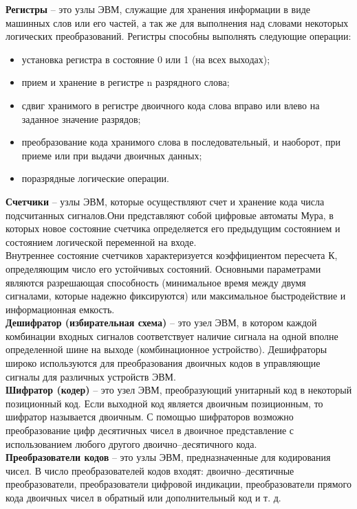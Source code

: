 \textbf{Регистры} -- это узлы ЭВМ, служащие для хранения информации в виде машинных слов или его частей, а так же для выполнения над словами некоторых логических преобразований.
Регистры способны выполнять следующие операции:
\begin{itemize}
  \item установка регистра в состояние 0 или 1 (на всех выходах);
  \item прием и хранение в регистре n разрядного слова;
  \item сдвиг хранимого в регистре двоичного кода слова вправо или влево на заданное значение разрядов;
  \item преобразование кода хранимого слова в последовательный, и наоборот, при приеме или при выдачи двоичных данных;
  \item поразрядные логические операции.
\end{itemize}
\textbf{Счетчики} -- узлы ЭВМ, которые осуществляют счет и хранение кода числа подсчитанных сигналов.Они представляют собой цифровые автоматы Мура, в которых новое состояние счетчика определяется его предыдущим состоянием и состоянием логической переменной на входе.
\\Внутреннее состояние счетчиков характеризуется коэффициентом пересчета К, определяющим число его устойчивых состояний. Основными параметрами являются разрешающая способность (минимальное время между двумя сигналами, которые надежно фиксируются) или максимальное быстродействие и информационная емкость.
\\\textbf{Дешифратор (избирательная схема)} -- это узел ЭВМ, в котором каждой комбинации входных сигналов соответствует наличие сигнала на одной вполне определенной шине на выходе (комбинационное устройство). Дешифраторы широко используются для преобразования двоичных кодов в управляющие сигналы для различных устройств ЭВМ.
\\\textbf{Шифратор (кодер)} -- это узел ЭВМ, преобразующий унитарный код в некоторый позиционный код. Если выходной код является двоичным позиционным, то шифратор называется двоичным. С помощью шифраторов возможно преобразование цифр десятичных чисел в двоичное представление с использованием любого другого двоично--десятичного кода.
\\\textbf{Преобразователи кодов} -- это узлы ЭВМ, предназначенные для кодирования чисел. В число преобразователей кодов входят: двоично--десятичные преобразователи, преобразователи цифровой индикации, преобразователи прямого кода двоичных чисел в обратный или дополнительный код и т. д.
